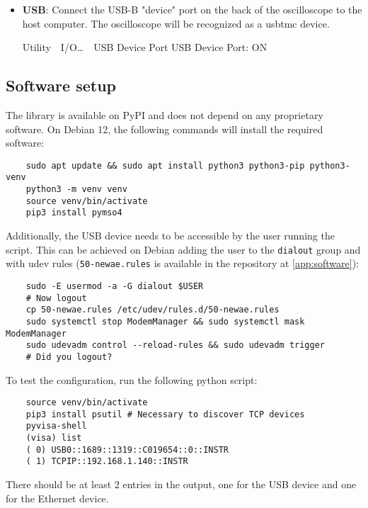 \documentclass[a4paper,english,twoside,10pt]{article}
\newenvironment{scope_setting}{
	\parskip=5pt\par\nopagebreak\centering\sffamily%
	\begin{tabular}{>{\columncolor{cyan!15}}m{2em} >{\columncolor{cyan!15}}m{.8\textwidth}}
	 & 
} {
	\\
	\end{tabular}
	\par\noindent\ignorespacesafterend%
}
\begin{document}
\begin{itemize}
	\item \textbf{USB}: Connect the USB-B "device" port on the back of the oscilloscope to the host computer. The oscilloscope will be recognized as a \gls{usbtmc} device.
	\begin{scope_setting}
		Utility\ \rightarrow\  I/O\ldots\ \rightarrow\  USB Device Port\newline
		USB Device Port: ON
	\end{scope_setting}
\end{itemize}

\subsection{Software setup}
The library is available on PyPI and does not depend on any proprietary software. On Debian 12, the following commands will install the required software:
\begin{verbatim}
	sudo apt update && sudo apt install python3 python3-pip python3-venv
	python3 -m venv venv
	source venv/bin/activate
	pip3 install pymso4
\end{verbatim}
Additionally, the USB device needs to be accessible by the user running the script. This can be achieved on Debian adding the user to the \texttt{dialout} group and with udev rules (\texttt{50-newae.rules} is available in the repository at \autoref{app:software}):
\begin{verbatim}
	sudo -E usermod -a -G dialout $USER
	# Now logout
	cp 50-newae.rules /etc/udev/rules.d/50-newae.rules
	sudo systemctl stop ModemManager && sudo systemctl mask ModemManager
	sudo udevadm control --reload-rules && sudo udevadm trigger
	# Did you logout?
\end{verbatim}
To test the configuration, run the following python script:
\begin{verbatim}
	source venv/bin/activate
	pip3 install psutil # Necessary to discover TCP devices
	pyvisa-shell
	(visa) list
	( 0) USB0::1689::1319::C019654::0::INSTR
	( 1) TCPIP::192.168.1.140::INSTR
\end{verbatim}
There should be at least 2 entries in the output, one for the USB device and one for the Ethernet device.
\end{document}

